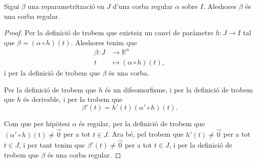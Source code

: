 \documentclass[../../Main.tex]{subfiles}
\begin{document}
	\begin{proposition}
		Sigui \(\beta\) una reparametrització en \(J\) d'una corba regular \(\alpha\) sobre \(I\). Aleshores \(\beta\) és una corba regular.
		\begin{proof}
			Per la definició de  trobem que existeix un canvi de paràmetre \(h:J\longrightarrow I\) tal que \(\beta=(\alpha\circ h)(t)\). Aleshores tenim que
			\begin{align*}
				\beta\colon J&\longrightarrow\mathbb{R}^{n} \\
				t&\longmapsto(\alpha\circ h)(t),
			\end{align*}
			i per la definició de  trobem que \(\beta\) és una corba.
			
			Per la definició de  trobem que \(h\) és un difeomorfisme, i per la definició de  trobem que \(h\) és derivable, i per la  trobem que
			\[\beta'(t)=h'(t)(\alpha'\circ h)(t).\]
			
			Com que per hipòtesi \(\alpha\) és regular, per la definició de  trobem que \((\alpha'\circ h)(t)\neq\vec{0}\) per a tot \(t\in J\). Ara bé, pel \corollari{}  trobem que \(h'(t)\neq\vec{0}\) per a tot \(t\in J\), i per tant tenim que \(\beta'(t)\neq\vec{0}\) per a tot \(t\in J\), i per la definició de  trobem que \(\beta\) és una corba regular.
		\end{proof}
	\end{proposition}
\end{document}
